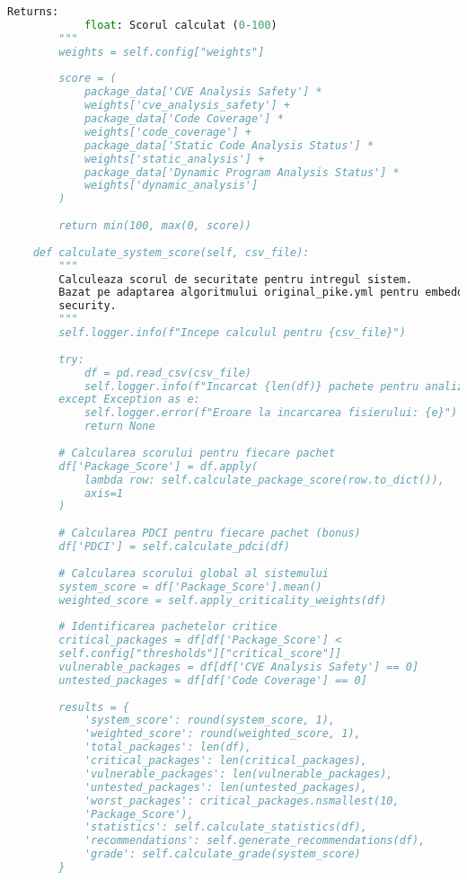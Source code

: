 \documentclass[12pt,a4paper]{article}
\begin{document}
\begin{lstlisting}[language=Python, caption=Script real pentru calcularea scorului de securitate (security\_calculator.py), label=lst:real_security_calculator]
        Returns:
            float: Scorul calculat (0-100)
        """
        weights = self.config["weights"]
        
        score = (
            package_data['CVE Analysis Safety'] * 
            weights['cve_analysis_safety'] +
            package_data['Code Coverage'] * 
            weights['code_coverage'] +
            package_data['Static Code Analysis Status'] * 
            weights['static_analysis'] +
            package_data['Dynamic Program Analysis Status'] * 
            weights['dynamic_analysis']
        )
        
        return min(100, max(0, score))
    
    def calculate_system_score(self, csv_file):
        """
        Calculeaza scorul de securitate pentru intregul sistem.
        Bazat pe adaptarea algoritmului original_pike.yml pentru embedded 
        security.
        """
        self.logger.info(f"Incepe calculul pentru {csv_file}")
        
        try:
            df = pd.read_csv(csv_file)
            self.logger.info(f"Incarcat {len(df)} pachete pentru analiza")
        except Exception as e:
            self.logger.error(f"Eroare la incarcarea fisierului: {e}")
            return None
        
        # Calcularea scorului pentru fiecare pachet
        df['Package_Score'] = df.apply(
            lambda row: self.calculate_package_score(row.to_dict()), 
            axis=1
        )
        
        # Calcularea PDCI pentru fiecare pachet (bonus)
        df['PDCI'] = self.calculate_pdci(df)
        
        # Calcularea scorului global al sistemului
        system_score = df['Package_Score'].mean()
        weighted_score = self.apply_criticality_weights(df)
        
        # Identificarea pachetelor critice
        critical_packages = df[df['Package_Score'] < 
        self.config["thresholds"]["critical_score"]]
        vulnerable_packages = df[df['CVE Analysis Safety'] == 0]
        untested_packages = df[df['Code Coverage'] == 0]
        
        results = {
            'system_score': round(system_score, 1),
            'weighted_score': round(weighted_score, 1),
            'total_packages': len(df),
            'critical_packages': len(critical_packages),
            'vulnerable_packages': len(vulnerable_packages),
            'untested_packages': len(untested_packages),
            'worst_packages': critical_packages.nsmallest(10,
            'Package_Score'),
            'statistics': self.calculate_statistics(df),
            'recommendations': self.generate_recommendations(df),
            'grade': self.calculate_grade(system_score)
        }
        

\end{lstlisting}
\end{document}
